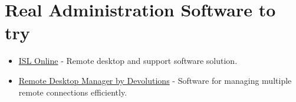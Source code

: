 \documentclass{article}
\begin{document}
\section{Real Administration Software to try}
\begin{itemize}
    \item \href{https://www.islonline.com/us/en/}{ISL Online} - Remote desktop and support software solution.
    \item \href{https://devolutions.net/remote-desktop-manager/}{Remote Desktop Manager by Devolutions} - Software for managing multiple remote connections efficiently.
\end{itemize}
    
\end{document}
